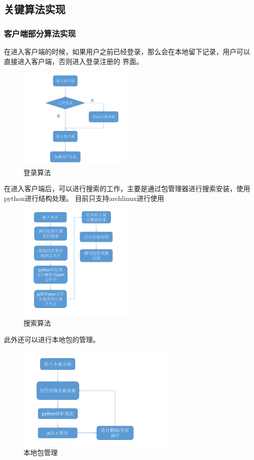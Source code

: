 \documentclass[supercite]{Experimental_Report}
\theoremstyle{definition}
\begin{document}
\subsection{关键算法实现}
\subsubsection{客户端部分算法实现}

在进入客户端的时候，如果用户之前已经登录，那么会在本地留下记录，用户可以直接进入客户端，否则进入登录注册的
界面。
\begin{figure}[!h]
    \centering
    \includegraphics[width=0.5\textwidth]{./images/log_al.png}
    \caption{登录算法}
    \label{login_al}
\end{figure}

在进入客户端后，可以进行搜索的工作，主要是通过包管理器进行搜索安装，使用python进行结构处理。
目前只支持archlinux进行使用

\begin{figure}[!h]
    \centering
    \includegraphics[width=0.5\textwidth]{./images/search.png}
    \caption{搜索算法}
    \label{search}
\end{figure}

此外还可以进行本地包的管理。
\newpage
\begin{figure}[!h]
    \centering
    \includegraphics[width=0.7\textwidth]{./images/del.png}
    \caption{本地包管理}
    \label{del}
\end{figure}
\end{document}

